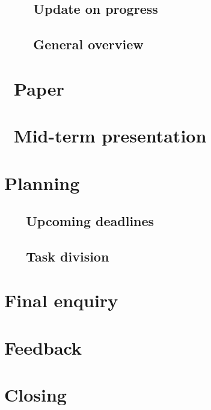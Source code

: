 \documentclass[a4paper,twoside,11pt]{article}
\begin{document}
	\subsection{\ \ \ \ Update on progress}
	\subsection{\ \ \ \ General overview}

\section{\ Paper}

\section{\ Mid-term presentation}

\section{Planning}
	\subsection{\ \ \ Upcoming deadlines}
	\subsection{\ \ \ Task division}

\section{Final enquiry}

\section{Feedback}

\section{Closing}
\end{document}
